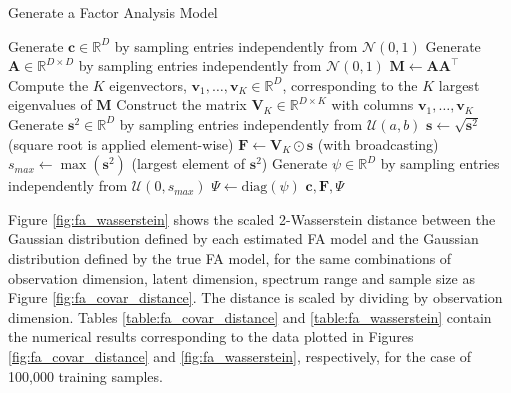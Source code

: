 \documentclass[msc,deptreport.inf]{infthesis} %
\newcommand{\matr}[1]{\mathbf{#1}}
\newcommand{\R}{\mathbb R}
\begin{document}
 \begin{algorithm}[!htbp] 
	\caption{Generate a Factor Analysis Model}
	\label{alg:generate_fa}
	\begin{algorithmic}[1]
		\State Generate $\matr{c} \in \R^D$ by sampling entries independently from $\mathcal{N}(0, 1)$
		\State Generate $\matr{A} \in \R^{D \times D}$ by sampling entries independently from $\mathcal{N}(0, 1)$
		\State $\matr{M} \leftarrow \matr{A} \matr{A}^\intercal$
		\State Compute the $K$ eigenvectors, $\matr{v}_1, \dots, \matr{v}_K \in \R^D$, corresponding to the $K$ largest eigenvalues of $\matr{M}$
		\State Construct the matrix $\matr{V}_K \in \R^{D \times K}$ with columns $\matr{v}_1, \dots, \matr{v}_K$
		\State Generate $\matr{s}^2 \in \R^D$ by sampling entries independently from $\mathcal{U}(a, b)$
		\State $\matr{s} \leftarrow \sqrt{\matr{s}^2}$ (square root is applied element-wise) 
		\State $\matr{F} \leftarrow \matr{V}_K \odot \matr{s}$ (with broadcasting)
		\State $s_{max} \leftarrow \max({\matr{s}^2})$ (largest element of ${\matr{s}^2}$)
		\State Generate $\psi \in \R^D$ by sampling entries independently from $\mathcal{U}(0, s_{max}) $
		\State $\Psi \leftarrow \text{diag}(\psi)$
		\State \Return $\matr{c}, \matr{F}, \Psi$	
	\end{algorithmic}
\end{algorithm}
 
Figure \ref{fig:fa_wasserstein} shows the scaled 2-Wasserstein distance between the Gaussian distribution defined by each estimated FA model and the Gaussian distribution defined by the true FA model, for the same combinations of observation dimension, latent dimension, spectrum range and sample size as Figure \ref{fig:fa_covar_distance}. The distance is scaled by dividing by observation dimension. Tables \ref{table:fa_covar_distance} and \ref{table:fa_wasserstein} contain the numerical results corresponding to the data plotted in  Figures \ref{fig:fa_covar_distance} and \ref{fig:fa_wasserstein}, respectively, for the case of 100,000 training samples. 
\end{document}

